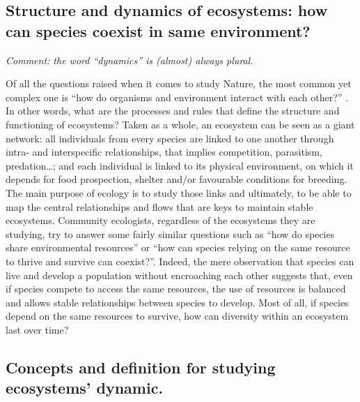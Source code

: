 

\subsection{Structure and dynamics of ecosystems: how can species coexist in same environment?} 

\emph{Comment: the word ``dynamics'' is (almost) always plural.}

Of all the questions raised when it comes to study Nature, the most common yet complex one is ``how do organisms and environment interact with each other?'' \citep{sutherland2013}. In other words, what are the processes and rules that define the structure and functioning of ecosystems? Taken as a whole, an ecosystem can be seen as a giant network: all individuals from every species are linked to one another through intra- and interspecific relationships, that implies competition, parasitism, predation\ldots{}; and each individual is linked to its physical environment, on which it depends for food prospection, shelter and/or favourable conditions for breeding. The main purpose of ecology is to study those links and ultimately, to be able to map the central relationships and flows that are keys to maintain stable ecosystems. Community ecologists, regardless of the ecosystems they are studying, try to answer some fairly similar questions such as ``how do species share environmental resources'' or ``how can species relying on the same resource to thrive and survive can coexist?''. Indeed, the mere observation that species can live and develop a population without encroaching each other suggests that, even if species compete to access the same resources, the use of resources is balanced and allows stable relationships between species to develop. Most of all, if species depend on the same resources to survive, how can diversity within an ecosystem last over time?

\subsection{Concepts and definition for studying ecosystems’ dynamic.}
 
